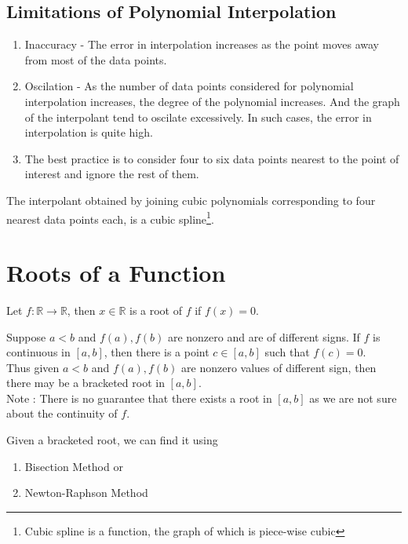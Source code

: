 \subsection{Limitations of Polynomial Interpolation}
\begin{enumerate}
	\item Inaccuracy - The error in interpolation increases as the point moves away from most of the data points.
	\item Oscilation - As the number of data points considered for polynomial interpolation increases, the degree of the polynomial increases. And the graph of the interpolant tend to oscilate excessively. In such cases, the error in interpolation is quite high. 
	\item The best practice is to consider four to six data points nearest to the point of interest and ignore the rest of them.
\end{enumerate}

\begin{remark}
	The interpolant obtained by joining cubic polynomials corresponding to four nearest data points each, is a cubic spline\footnote{Cubic spline is a function, the graph of which is piece-wise cubic}.
\end{remark}

\section{Roots of a Function}
\begin{definition}
	Let $f : \mathbb{R} \to \mathbb{R}$, then $x \in \mathbb{R}$ is a root of $f$ if $f(x) = 0$.
\end{definition}

\begin{remark}
	Suppose $a <  b$ and $f(a), f(b)$ are nonzero and are of different signs. If $f$ is continuous in $[a,b]$, then there is a point $c \in [a,b]$ such that $f(c) = 0$.\\
	
	Thus given $a<b$ and $f(a),f(b)$ are nonzero values of different sign, then there may be a bracketed root in $[a,b]$.\\
	
	Note : There is no guarantee that there exists a root in $[a,b]$ as we are not sure about the continuity of $f$.
\end{remark}

\begin{remark}
	Given a bracketed root, we can find it using
	\begin{enumerate}
		\item Bisection Method or
		\item Newton-Raphson Method
	\end{enumerate}
\end{remark}

